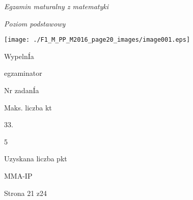 \documentclass[a4paper,12pt]{article}
\begin{document}
{\it Egzamin maturalny z matematyki}

{\it Poziom podstawowy}
\begin{center}
\texttt{[image: ./F1\_M\_PP\_M2016\_page20\_images/image001.eps]}
\end{center}
WypelnÍa

egzaminator

Nr zadanÍa

Maks. liczba kt

33.

5

Uzyskana liczba pkt

MMA-IP

Strona 21 z24
\end{document}
